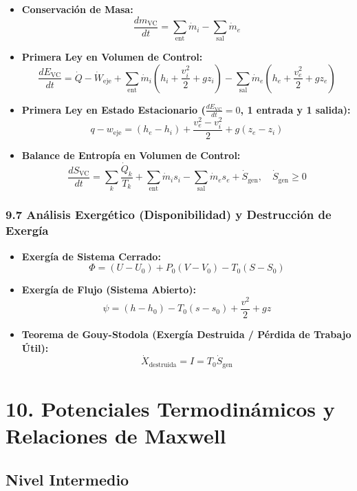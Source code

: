 \documentclass[11pt,a4paper]{article}
\begin{document}
\begin{itemize}
  \item \textbf{Conservación de Masa:}
  \[
    \frac{dm_{\text{VC}}}{dt} = \sum_{\text{ent}} \dot{m}_i - \sum_{\text{sal}} \dot{m}_e
  \]
  \item \textbf{Primera Ley en Volumen de Control:}
  \[
    \frac{dE_{\text{VC}}}{dt} = \dot{Q} - \dot{W}_{\text{eje}} + \sum_{\text{ent}} \dot{m}_i \left( h_i + \frac{v_i^2}{2} + g z_i \right) - \sum_{\text{sal}} \dot{m}_e \left( h_e + \frac{v_e^2}{2} + g z_e \right)
  \]
  \item \textbf{Primera Ley en Estado Estacionario ($\frac{dE_{\text{VC}}}{dt} = 0$, 1 entrada y 1 salida):}
  \[
    q - w_{\text{eje}} = (h_e - h_i) + \frac{v_e^2 - v_i^2}{2} + g(z_e - z_i)
  \]
  \item \textbf{Balance de Entropía en Volumen de Control:}
  \[
    \frac{dS_{\text{VC}}}{dt} = \sum_k \frac{\dot{Q}_k}{T_k} + \sum_{\text{ent}} \dot{m}_i s_i - \sum_{\text{sal}} \dot{m}_e s_e + \dot{S}_{\text{gen}}, \quad \dot{S}_{\text{gen}} \ge 0
  \]
\end{itemize}

\subsubsection*{9.7 Análisis Exergético (Disponibilidad) y Destrucción de Exergía}

\begin{itemize}
  \item \textbf{Exergía de Sistema Cerrado:}
  \[
    \Phi = (U - U_0) + P_0(V - V_0) - T_0(S - S_0)
  \]
  \item \textbf{Exergía de Flujo (Sistema Abierto):}
  \[
    \psi = (h - h_0) - T_0(s - s_0) + \frac{v^2}{2} + gz
  \]
  \item \textbf{Teorema de Gouy-Stodola (Exergía Destruida / Pérdida de Trabajo Útil):}
  \[
    \dot{X}_{\text{destruida}} = I = T_0 \dot{S}_{\text{gen}}
  \]
\end{itemize}

\section*{10. Potenciales Termodinámicos y Relaciones de Maxwell}

\subsection*{Nivel Intermedio}
\end{document}
